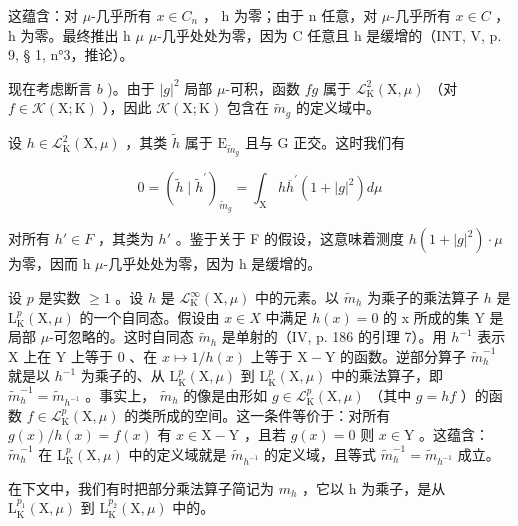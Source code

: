 这蕴含：对 \(\mu\)-几乎所有 \(x \in C_{n}\) ， h 为零；由于 n 任意，对 \(\mu\)-几乎所有 \(x \in C\) ， h 为零。最终推出 h \(\mu\) \(\mu\)-几乎处处为零，因为 C 任意且 h 是缓增的（INT, V, p. 9, § 1, n°3，推论）。

现在考虑断言 \(b\) )。由于 \(|g|^2\) 局部 \(\mu\)-可积，函数 \(fg\) 属于 \(\mathcal{L}_{\mathrm{K}}^{2}(\mathrm{X},\mu)\) （对 \(f\in\mathcal{K}(\mathrm{X};\mathrm{K})\) ），因此 \(\mathcal{K}(\mathrm{X};\mathrm{K})\) 包含在 \(\widetilde{m}_{g}\) 的定义域中。

设 \(h \in \mathcal{L}_{\mathrm{K}}^{2}(\mathrm{X}, \mu)\) ，其类 \(\widetilde{h}\) 属于 \(\mathrm{E}_{\widetilde{m}_{g}}\) 且与 G 正交。这时我们有

\[
0 = (\widetilde {h} \mid \widetilde {h} ^ {\prime}) _ {\widetilde {m} _ {g}} = \int_ {\mathrm{X}} h \overline {{h}} ^ {\prime} (1 + | g | ^ {2}) d \mu
\]

对所有 \(h' \in F\) ，其类为 \(h'\) 。鉴于关于 F 的假设，这意味着测度 \(h(1 + |g|^{2}) \cdot \mu\) 为零，因而 h \(\mu\)-几乎处处为零，因为 h 是缓增的。

设 \(p\) 是实数 \(\geqslant 1\) 。设 \(h\) 是 \(\mathcal{L}_{\mathrm{K}}^{\infty}(\mathrm{X},\mu)\) 中的元素。以 \(\widetilde{m}_h\) 为乘子的乘法算子 \(h\) 是 \(\mathrm{L}_{\mathrm{K}}^{p}(\mathrm{X},\mu)\) 的一个自同态。假设由 \(x\in X\) 中满足 \(h(x)=0\) 的 x 所成的集 Y 是局部 \(\mu\)-可忽略的。这时自同态 \(\widetilde{m}_h\) 是单射的（IV, p. 186 的引理 7）。用 \(h^{-1}\) 表示 X 上在 Y 上等于 0 、在 \(x \mapsto 1/h(x)\) 上等于 \(\mathrm{X} - \mathrm{Y}\) 的函数。逆部分算子 \(\widetilde{m}_{h}^{-1}\) 就是以 \(h^{-1}\) 为乘子的、从 \(\mathrm{L}_{\mathrm{K}}^{p}(\mathrm{X},\mu)\) 到 \(\mathrm{L}_{\mathrm{K}}^{p}(\mathrm{X},\mu)\) 中的乘法算子，即 \(\widetilde{m}_{h}^{-1} = \widetilde{m}_{h^{-1}}\) 。事实上， \(\widetilde{m}_{h}\) 的像是由形如 \(g \in \mathcal{L}_{\mathrm{K}}^{p}(\mathrm{X},\mu)\) （其中 \(g = hf\) ）的函数 \(f \in \mathcal{L}_{\mathrm{K}}^{p}(\mathrm{X},\mu)\) 的类所成的空间。这一条件等价于：对所有 \(g(x)/h(x) = f(x)\) 有 \(x \in \mathrm{X} - \mathrm{Y}\) ，且若 \(g(x) = 0\) 则 \(x \in \mathrm{Y}\) 。这蕴含： \(\widetilde{m}_{h}^{-1}\) 在 \(\mathrm{L}_{\mathrm{K}}^{p}(\mathrm{X},\mu)\) 中的定义域就是 \(\widetilde{m}_{h^{-1}}\) 的定义域，且等式 \(\widetilde{m}_{h}^{-1} = \widetilde{m}_{h^{-1}}\) 成立。

在下文中，我们有时把部分乘法算子简记为 \(m_{h}\) ，它以 h 为乘子，是从 \(\mathrm{L}_{\mathrm{K}}^{p_{1}}(\mathrm{X},\mu)\) 到 \(\mathrm{L}_{\mathrm{K}}^{p_{2}}(\mathrm{X},\mu)\) 中的。

